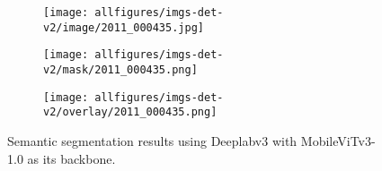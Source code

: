 \documentclass{article} \usepackage{iclr2022_conference,times}
\begin{document}
\begin{figure}[ht]
\begin{subfigure}{.33\textwidth}
  \centering
  \texttt{[image: allfigures/imgs-det-v2/image/2011\_000435.jpg]}
\end{subfigure}\hfil
\begin{subfigure}{.33\textwidth}
  \centering
  \texttt{[image: allfigures/imgs-det-v2/mask/2011\_000435.png]}
\end{subfigure}\hfil
\begin{subfigure}{.33\textwidth}
  \centering
  \texttt{[image: allfigures/imgs-det-v2/overlay/2011\_000435.png]}
\end{subfigure}
\caption{Semantic segmentation results using Deeplabv3 with MobileViTv3-1.0 as its backbone.}
\label{fig:seg-mv3v2}
\end{figure}
\end{document}
